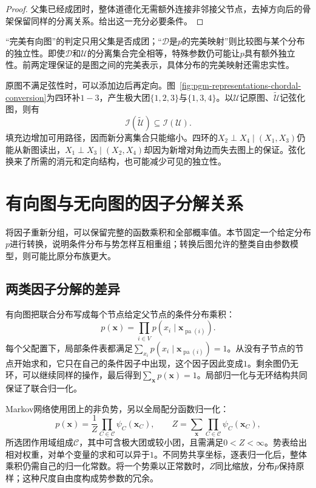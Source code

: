 \begin{proof}
父集已经成团时，整体道德化无需额外连接非邻接父节点，去掉方向后的骨架保留同样的分离关系。给出这一充分必要条件。
\end{proof}

“完美有向图”的判定只用父集是否成团；“$\mathcal{D}$是$p$的完美映射”则比较图与某个分布的独立性。即使$\mathcal{D}$和$\mathcal{U}$的分离集合完全相等，特殊参数仍可能让$p$具有额外独立性。前两定理保证的是图之间的完美表示，具体分布的完美映射还需忠实性。

原图不满足弦性时，可以添加边后再定向。图~\ref{fig:pgm-representations-chordal-conversion}为四环补$1-3$，产生极大团$\{1,2,3\}$与$\{1,3,4\}$。以$\mathcal{U}$记原图、$\widetilde{\mathcal{U}}$记弦化图，则有
\[
  \mathcal{I}(\widetilde{\mathcal{U}})
  \subseteq \mathcal{I}(\mathcal{U}).
\]
填充边增加可用路径，因而新分离集合只能缩小。四环的$X_2\perp X_4\mid(X_1,X_3)$仍能从新图读出，$X_1\perp X_3\mid(X_2,X_4)$却因为新增对角边而失去图上的保证。弦化换来了所需的消元和定向结构，也可能减少可见的独立性。

\section{有向图与无向图的因子分解关系}
\label{sec:pgm-representations-factorizations}

将因子重新分组，可以保留完整的函数乘积和全部概率值。本节固定一个给定分布$p$进行转换，说明条件分布与势怎样互相重组；转换后图允许的整类自由参数模型，则可能比原分布族更大。

\subsection{两类因子分解的差异}
\label{sec:pgm-representations-normalization}

有向图把联合分布写成每个节点给定父节点的条件分布乘积：
\begin{equation}
  p(\bm{x})=\prod_{i\in V}
  p(x_i\mid\bm{x}_{\operatorname{pa}(i)}).
  \label{eq:pgm-representations-directed-product}
\end{equation}
每个父配置下，局部条件表都满足$\sum_{x_i}p(x_i\mid\bm{x}_{\operatorname{pa}(i)})=1$。从没有子节点的节点开始求和，它只在自己的条件因子中出现，这个因子因此变成$1$。剩余图仍无环，可以继续同样的操作，最后得到$\sum_{\bm{x}}p(\bm{x})=1$。局部归一化与无环结构共同保证了联合归一化。

Markov网络使用团上的非负势，另以全局配分函数归一化：
\begin{equation}
  p(\bm{x})=\frac{1}{Z}
  \prod_{C\in\mathcal{C}}\psi_C(\bm{x}_C),
  \qquad
  Z=\sum_{\bm{x}}\prod_{C\in\mathcal{C}}\psi_C(\bm{x}_C),
  \label{eq:pgm-representations-undirected-product}
\end{equation}
所选团作用域组成$\mathcal{C}$，其中可含极大团或较小团，且需满足$0<Z<\infty$。势表给出相对权重，对单个变量的求和可以异于$1$。不同势共享坐标，逐表归一化后，整体乘积仍需自己的归一化常数。将一个势乘以正常数时，$Z$同比缩放，分布$p$保持原样；这种尺度自由度构成势参数的冗余。

